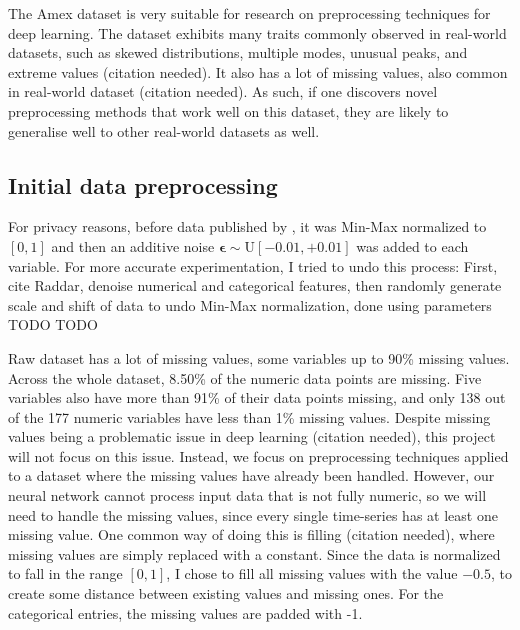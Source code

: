 \documentclass{statsmsc}
\begin{document}
{%
The Amex dataset is very suitable for research on preprocessing techniques for
deep learning.  The dataset exhibits many traits commonly observed in
real-world datasets, such as skewed distributions, multiple modes, unusual
peaks, and extreme values (citation needed). It also has a lot of missing values, also common in
real-world dataset (citation needed). As such, if one discovers novel preprocessing methods that
work well on this dataset, they are likely to generalise well to other real-world datasets as well.


\subsection{Initial data preprocessing}%
\label{sub:Data formatting}

For privacy reasons, before data published by \cite{amex-data}, it was Min-Max
normalized to $[0, 1]$ and then an additive noise $\bm\epsilon \sim
\textrm{U}[-0.01,+0.01]$ was added to each variable. For more accurate
experimentation, I tried to undo this process: First, cite Raddar, denoise
numerical and categorical features, then randomly generate scale and shift of
data to undo Min-Max normalization, done using parameters TODO TODO

Raw dataset has a lot of missing values, some variables up to 90\% missing
values.  Across the whole dataset, 8.50\% of the numeric data points are
missing. Five variables also have more than 91\% of their data points missing,
and only 138 out of the 177 numeric variables have less than 1\% missing
values.  Despite missing values being a problematic issue in deep learning
(citation needed), this project will not focus on this issue.  Instead, we
focus on preprocessing techniques applied to a dataset where the missing values
have already been handled. However, our neural network cannot process input
data that is not fully numeric, so we will need to handle the missing values,
since every single time-series has at least one missing value. One common way
of doing this is filling (citation needed), where missing values are simply
replaced with a constant. Since the data is normalized to fall in the range
$[0,1]$, I chose to fill all missing values with the value $-0.5$, to create
some distance between existing values and missing ones. For the categorical
entries, the missing values are padded with -1.

}
\end{document}
